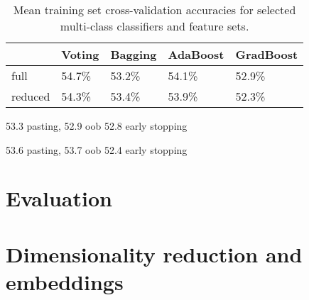 \documentclass[10pt, twocolumn]{article}
\begin{document}
\begin{table}[]
	\begin{tabularx}{\linewidth}{XXXXX}
		\hline
			& \textbf{Voting} & \textbf{Bagging} & \textbf{AdaBoost} & \textbf{GradBoost} \\ \hline
	full   & 54.7\%  & 53.2\% & 54.1\% & 52.9\% \\
	reduced & 54.3\% & 53.4\% & 53.9\% & 52.3\% \\ 
	\hline
	\end{tabularx}
	\caption{Mean training set cross-validation accuracies for selected multi-class classifiers and feature sets.}\label{multiclass}
\end{table}

53.3 pasting, 52.9 oob 
52.8 early stopping


53.6 pasting, 53.7 oob
52.4 early stopping





\section{Evaluation}

\section{Dimensionality reduction and embeddings}
\end{document}
